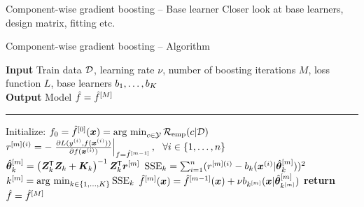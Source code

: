 \documentclass[10pt]{beamer}
\begin{document}
\begin{frame}{Component-wise gradient boosting -- Base learner}
  Closer look at base learners, design matrix, fitting etc.
\end{frame}

\begin{frame}{Component-wise gradient boosting -- Algorithm}

  \begin{algorithm}[H]
  \footnotesize
  \caption{Vanilla CWB algorithm}\label{algo:cwb}
  \vspace{0.15cm}
  \hspace*{\algorithmicindent} \textbf{Input} Train data $\mathcal{D}$, learning rate $\nu$, number of boosting iterations $M$, loss\\
  \hspace*{\algorithmicindent}  function $L$, base learners $b_1, \dots, b_K$\\
    \hspace*{\algorithmicindent} \textbf{Output} Model $\hat{f} = \hat{f}^{[M]}$\vspace{0.1cm}
  \hrule
  \begin{algorithmic}[1]
      \State Initialize: $f_0 = \hat{f}^{[0]}(\bm{x}) = \operatorname{arg~min}_{c\in\mathcal{Y}}\mathcal{R}_{\text{emp}}(c|\mathcal{D})$
          \State $r^{[m](i)} = -\left.\frac{\partial L(y^{(i)}, f(\bm{x}^{(i)}))}{\partial f(\bm{x}^{(i)})}\right|_{f = \hat{f}^{[m-1]}},\ \ \forall i \in \{1, \dots, n\}$%
              \State $\hat{\bm{\theta}}^{[m]}_k = \left(\bm{Z}_k^{\mkern-1.5mu\mathsf{T}} \bm{Z}_k + \bm{K}_k\right)^{-1} \bm{Z}^{\mkern-1.5mu\mathsf{T}}_k \bm{r}^{[m]}$%
              \State $\operatorname{SSE}_k = \sum_{i=1}^n(r^{[m](i)} - b_k(\bm{x}^{(i)} | \hat{\bm{\theta}}^{[m]}_k))^2$%
          \EndFor
          \State $k^{[m]} = \operatorname{arg~min}_{k\in\{1, \dots, K\}} \operatorname{SSE}_k$%
          \State $\hat{f}^{[m]}(\bm{x}) = \hat{f}^{[m-1]}(\bm{x}) + \nu b_{k^{[m]}} (\bm{x} | \hat{\bm{\theta}}^{[m]}_{k^{[m]}})$
      \EndWhile
      \State \textbf{return} $\hat{f} = \hat{f}^{[M]}$
  \EndProcedure
  \end{algorithmic}
  \end{algorithm}
\end{frame}
\end{document}
